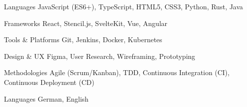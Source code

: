 \begin{cvskills}

  \cvskill
  {Languages} %
  {JavaScript (ES6+), TypeScript, HTML5, CSS3, Python, Rust, Java} %

  \cvskill
  {Frameworks} %
  {React, Stencil.js, SvelteKit, Vue, Angular} %

  \cvskill
  {Tools \& Platforms} %
  {Git, Jenkins, Docker, Kubernetes} %

  \cvskill
  {Design \& UX} %
  {Figma, User Research, Wireframing, Prototyping} %

  \cvskill
  {Methodologies} %
  {Agile (Scrum/Kanban), TDD, Continuous Integration (CI), Continuous Deployment (CD)} %

  \cvskill
  {Languages} %
  {German, English} %

\end{cvskills}
